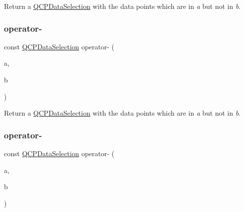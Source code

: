 Return a \mbox{\hyperlink{class_q_c_p_data_selection}{Q\+C\+P\+Data\+Selection}} with the data points which are in {\itshape a} but not in {\itshape b}. \mbox{\label{class_q_c_p_data_selection_a726652cb9ed840e3025435cc2c266468}} 
\subsubsection{\texorpdfstring{operator-\/}{operator-}\hspace{0.1cm}{\footnotesize\ttfamily [2/4]}}
{\footnotesize\ttfamily const \mbox{\hyperlink{class_q_c_p_data_selection}{Q\+C\+P\+Data\+Selection}} operator-\/ (\begin{DoxyParamCaption}\item[{const \mbox{\hyperlink{class_q_c_p_data_range}{Q\+C\+P\+Data\+Range}} \&}]{a,  }\item[{const \mbox{\hyperlink{class_q_c_p_data_selection}{Q\+C\+P\+Data\+Selection}} \&}]{b }\end{DoxyParamCaption})\hspace{0.3cm}{\ttfamily [friend]}}

Return a \mbox{\hyperlink{class_q_c_p_data_selection}{Q\+C\+P\+Data\+Selection}} with the data points which are in {\itshape a} but not in {\itshape b}. \mbox{\label{class_q_c_p_data_selection_a32c5784ac70946f09a09b2dd19816b78}} 
\subsubsection{\texorpdfstring{operator-\/}{operator-}\hspace{0.1cm}{\footnotesize\ttfamily [3/4]}}
{\footnotesize\ttfamily const \mbox{\hyperlink{class_q_c_p_data_selection}{Q\+C\+P\+Data\+Selection}} operator-\/ (\begin{DoxyParamCaption}\item[{const \mbox{\hyperlink{class_q_c_p_data_selection}{Q\+C\+P\+Data\+Selection}} \&}]{a,  }\item[{const \mbox{\hyperlink{class_q_c_p_data_range}{Q\+C\+P\+Data\+Range}} \&}]{b }\end{DoxyParamCaption})\hspace{0.3cm}{\ttfamily [friend]}}

